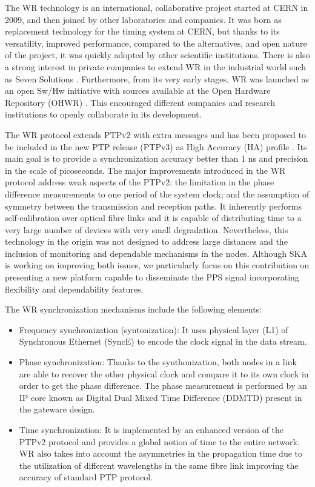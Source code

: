 The WR technology \cite{Wlostowski2011} is an international, collaborative project started at CERN in 2009, and then joined by other laboratories and companies. It was born as replacement technology for the timing system at CERN, but thanks to its versatility, improved performance, compared to the alternatives, and open nature of the project, it was quickly adopted by other scientific institutions. There is also a strong interest in private companies to extend WR in the industrial world such as Seven Solutions \cite{sevensols:wr}. Furthermore, from its very early stages, WR was launched as an open Sw/Hw initiative with sources available at the Open Hardware Repository (OHWR) \cite{ohwr:repo}. This encouraged different companies and research institutions to openly collaborate in its development.

The WR protocol extends PTPv2 with extra messages and has been proposed to be included in the new PTP release (PTPv3) as High Accuracy (HA) profile \cite{wr:maciej-ptpv3-standard}
. Its main goal is to provide a synchronization accuracy better than 1 ns and precision in the scale of picoseconds. The major improvements introduced in the WR protocol address weak aspects of the PTPv2: the limitation in the phase difference measurements to one period of the system clock; and the assumption of symmetry between the transmission and reception paths. It inherently performs self-calibration over optical fibre links and it is capable of distributing time to a very large number of devices with very small degradation. Nevertheless, this technology in the origin was not designed to address large distances and the inclusion of monitoring and dependable mechanisms in the nodes. Although SKA is working on improving both issues, we particularly focus on this contribution on presenting a new platform capable to disseminate the PPS signal incorporating flexibility and dependability features.  

The WR synchronization mechanisms include the following elements:

\begin{itemize}
	\item {Frequency synchronization (syntonization): It uses physical layer (L1) of Synchronous Ethernet (SyncE) to encode the clock signal in the data stream. }
	\item {Phase synchronization: Thanks to the synthonization, both nodes in a link are able to recover the other physical clock and compare it to its own clock in order to get the phase difference. The phase measurement is performed by an IP core known as Digital Dual Mixed Time Difference (DDMTD) present in the gateware design.}
	\item {Time synchronization: It is implemented by an enhanced version of the PTPv2 protocol and provides a global notion of time to the entire network. WR also takes into account the asymmetries in the propagation time due to the utilization of different wavelengths in the same fibre link improving the accuracy of standard PTP protocol.}
\end{itemize}

